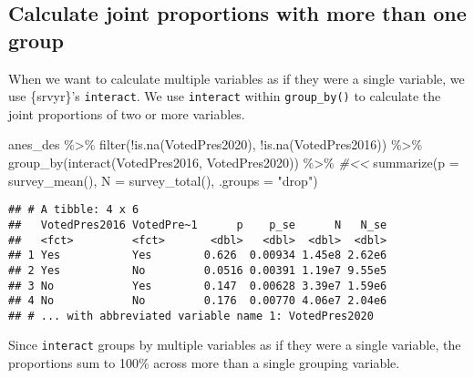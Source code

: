 \documentclass[
]{krantz}
\makeatletter
\newenvironment{Shaded}{\begin{snugshade}}{\end{snugshade}}
\newcommand{\AttributeTok}[1]{\textcolor[rgb]{0.61,0.61,0.61}{#1}}
\newcommand{\CommentTok}[1]{\textcolor[rgb]{0.37,0.37,0.37}{\textit{#1}}}
\newcommand{\FunctionTok}[1]{\textcolor[rgb]{0,0,0}{#1}}
\newcommand{\NormalTok}[1]{#1}
\newcommand{\SpecialCharTok}[1]{\textcolor[rgb]{0,0,0}{#1}}
\newcommand{\StringTok}[1]{\textcolor[rgb]{0.5,0.5,0.5}{#1}}
\newenvironment{kframe}{%
\medskip{}
\setlength{\fboxsep}{.8em}
 \def\at@end@of@kframe{}%
 \ifinner\ifhmode%
  \def\at@end@of@kframe{\end{minipage}}%
  \begin{minipage}{\columnwidth}%
 \fi\fi%
 \def\FrameCommand##1{\hskip\@totalleftmargin \hskip-\fboxsep
 \colorbox{shadecolor}{##1}\hskip-\fboxsep
     \hskip-\linewidth \hskip-\@totalleftmargin \hskip\columnwidth}%
 \MakeFramed {\advance\hsize-\width
   \@totalleftmargin\z@ \linewidth\hsize
   \@setminipage}}%
 {\par\unskip\endMakeFramed%
 \at@end@of@kframe}
\renewenvironment{Shaded}{\begin{kframe}}{\end{kframe}}
\makeatother
\begin{document}
\hypertarget{calculate-joint-proportions-with-more-than-one-group}{%
\subsection{Calculate joint proportions with more than one group}\label{calculate-joint-proportions-with-more-than-one-group}}

When we want to calculate multiple variables as if they were a single variable, we use \{srvyr\}'s \texttt{interact}. We use \texttt{interact} within \texttt{group\_by()} to calculate the joint proportions of two or more variables.

\begin{Shaded}
\begin{Highlighting}[]
\NormalTok{anes\_des }\SpecialCharTok{\%\textgreater{}\%}
  \FunctionTok{filter}\NormalTok{(}\SpecialCharTok{!}\FunctionTok{is.na}\NormalTok{(VotedPres2020), }\SpecialCharTok{!}\FunctionTok{is.na}\NormalTok{(VotedPres2016)) }\SpecialCharTok{\%\textgreater{}\%}
  \FunctionTok{group\_by}\NormalTok{(}\FunctionTok{interact}\NormalTok{(VotedPres2016, VotedPres2020)) }\SpecialCharTok{\%\textgreater{}\%} \CommentTok{\#\textless{}\textless{}}
  \FunctionTok{summarize}\NormalTok{(}\AttributeTok{p =} \FunctionTok{survey\_mean}\NormalTok{(),}
            \AttributeTok{N =} \FunctionTok{survey\_total}\NormalTok{(),}
            \AttributeTok{.groups =} \StringTok{"drop"}\NormalTok{)}
\end{Highlighting}
\end{Shaded}

\begin{verbatim}
## # A tibble: 4 x 6
##   VotedPres2016 VotedPre~1      p    p_se      N   N_se
##   <fct>         <fct>       <dbl>   <dbl>  <dbl>  <dbl>
## 1 Yes           Yes        0.626  0.00934 1.45e8 2.62e6
## 2 Yes           No         0.0516 0.00391 1.19e7 9.55e5
## 3 No            Yes        0.147  0.00628 3.39e7 1.59e6
## 4 No            No         0.176  0.00770 4.06e7 2.04e6
## # ... with abbreviated variable name 1: VotedPres2020
\end{verbatim}

Since \texttt{interact} groups by multiple variables as if they were a single variable, the proportions sum to 100\% across more than a single grouping variable.
\end{document}
